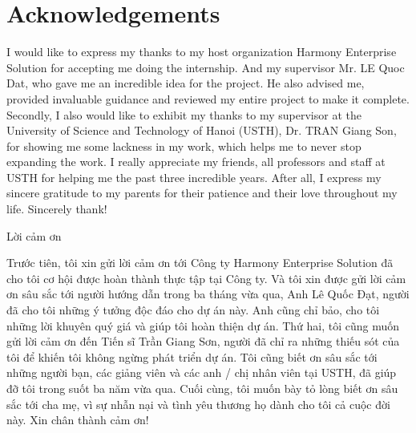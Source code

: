 \chapter*{Acknowledgements}
\noindent%
I would like to express my thanks to my host organization Harmony Enterprise Solution for accepting me doing the internship. And my supervisor Mr. LE Quoc Dat, who gave me an incredible idea for the project. He also advised me, provided invaluable guidance and reviewed my entire project to make it complete. Secondly, I also would like to exhibit my thanks to my supervisor at the University of Science and Technology of Hanoi (USTH), Dr. TRAN Giang Son, for showing me some lackness in my work, which helps me to never stop expanding the work. I really appreciate my friends, all professors and staff at USTH for helping me the past three incredible years. After all, I express my sincere gratitude to my parents for their patience and their love throughout my life. Sincerely thank!
\noindent%
 \newline

\begin{otherlanguage}{vietnamese}

\vspace{3cm}



{\Large\noindent%
Lời cảm ơn \newline}

\noindent%
Trước tiên, tôi xin gửi lời cảm ơn tới Công ty Harmony Enterprise Solution đã cho tôi cơ hội được hoàn thành thực tập tại Công ty. Và tôi xin được gửi lời cảm ơn sâu sắc tới người hướng dẫn trong ba tháng vừa qua, Anh Lê Quốc Đạt, người đã cho tôi những ý tưởng độc đáo cho dự án này. Anh cũng chỉ bảo, cho tôi những lời khuyên quý giá và giúp tôi hoàn thiện dự án. Thứ hai, tôi cũng muốn gửi lời cảm ơn đến Tiến sĩ Trần Giang Sơn, người đã chỉ ra những thiếu sót của tôi để khiến tôi không ngừng phát triển dự án. Tôi cũng biết ơn sâu sắc tới những người bạn, các giảng viên và các anh / chị nhân viên tại USTH, đã giúp đỡ tôi trong suốt ba năm vừa qua. Cuối cùng, tôi muốn bày tỏ lòng biết ơn sâu sắc tới cha mẹ, vì sự nhẫn nại và tình yêu thương họ dành cho tôi cả cuộc đời này. Xin chân thành cảm ơn!

\end{otherlanguage}
\vspace{3cm}